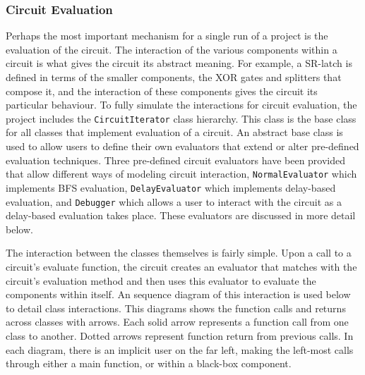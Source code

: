 \documentclass{article}
\newcommand{\ClassName}[1]{\texttt{#1}}
\begin{document}
\subsubsection{Circuit Evaluation}

Perhaps the most important mechanism for a single run of a project is the evaluation of the circuit. The interaction of the various components within a circuit is what gives the circuit its abstract meaning. For example, a SR-latch is defined in terms of the smaller components, the XOR gates and splitters that compose it, and the interaction of these components gives the circuit its particular behaviour. To fully simulate the interactions for circuit evaluation, the project includes the \ClassName{CircuitIterator} class hierarchy. This class is the base class for all classes that implement evaluation of a circuit.  An abstract base class is used to allow users to define their own evaluators that extend or alter pre-defined evaluation techniques. Three pre-defined circuit evaluators have been provided that allow different ways of modeling circuit interaction, \ClassName{NormalEvaluator} which implements BFS evaluation, \ClassName{DelayEvaluator} which implements delay-based evaluation, and \ClassName{Debugger}
 which allows a user to interact with the circuit as a delay-based evaluation takes place. These evaluators are discussed in more detail below.

The interaction between the classes themselves is fairly simple. Upon a call to a circuit's evaluate function, the circuit creates an evaluator that matches with the circuit’s evaluation method and then uses this evaluator to evaluate the components within itself. An sequence diagram of this interaction is used below to detail class interactions. This diagrams shows the function calls and returns across classes with arrows. Each solid arrow represents a function call from one class to another. Dotted arrows represent function return from previous calls. In each diagram, there is an implicit user on the far left, making the left-most calls through either a main function, or within a black-box component.
\end{document}
